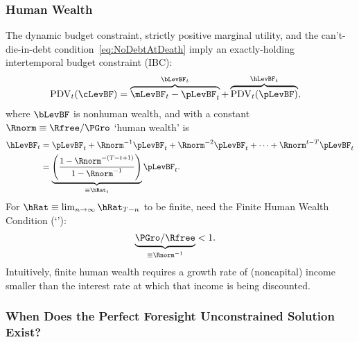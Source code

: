 \documentclass[BufferStockTheory]{subfiles}
\begin{document}
\subsubsection{Human Wealth}
The dynamic budget constraint, strictly positive marginal utility, and the can't-die-in-debt condition~\eqref{eq:NoDebtAtDeath} imply an exactly-holding intertemporal budget constraint (IBC):
\begin{align}
  \mathrm{PDV}_{t}(\cLevBF)  & = \overbrace{\mLevBF_{t}-\pLevBF_{t}}^{\bLevBF_{t}}+\overbrace{\mathrm{PDV}_{t}(\pLevBF)}^{\hLevBF_{t}}, \label{eq:IBCFinite}
\end{align} \hypertarget{FHWF}{}
where $\bLevBF$ is nonhuman wealth, and with a constant $\Rnorm \equiv \Rfree/\PGro$ `human wealth' is
\begin{align}
  \hLevBF_{t}  & = \pLevBF_{t}+\Rnorm^{-1} \pLevBF_{t} + \Rnorm^{-2} \pLevBF_{t} + \cdots + \Rnorm^{t-T} \pLevBF_{t} \notag
  \\  & = \underbrace{\left(\frac{1-\Rnorm^{-(T-t+1)}}{1-\Rnorm^{-1}}\right)}_{\equiv \hRat_{t}}\pLevBF_{t} \label{eq:HDef}.
\end{align}\hypertarget{FHWC}{}
For $\hRat \equiv \lim_{n \rightarrow \infty} \hRat_{T-n}$ to be finite, need the Finite Human Wealth Condition (`\FHWC'):
\begin{align}
  \underbrace{\PGro/\Rfree}_{\equiv \Rnorm^{-1}}  & < 1 \label{eq:FHWC}.
\end{align}
Intuitively, finite human wealth requires a growth rate of (noncapital) income smaller than the interest rate at which that income is being discounted.

\hypertarget{Unconstrained-Solution}{}\hypertarget{PF-Unconstrained-Solution}{}
\subsubsection{When Does the Perfect Foresight Unconstrained Solution Exist?}\label{subsec:PFUncon}
\hypertarget{APF}{}\hypertarget{AIC}{}
\end{document}
